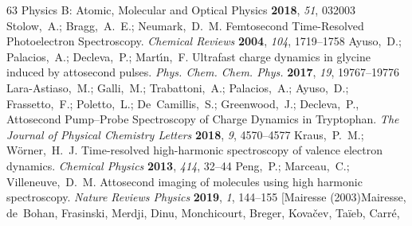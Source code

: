 \documentclass[journal=jacsat,manuscript=article]{achemso}
\begin{document}
\begin{mcitethebibliography}{63}
{  Physics B: Atomic, Molecular and Optical Physics} \textbf{2018}, \emph{51},
  032003\relax
\mciteBstWouldAddEndPuncttrue
\mciteSetBstMidEndSepPunct{\mcitedefaultmidpunct}
{\mcitedefaultendpunct}{\mcitedefaultseppunct}\relax
\EndOfBibitem
{}
Stolow,~A.; Bragg,~A.~E.; Neumark,~D.~M. Femtosecond Time-Resolved
  Photoelectron Spectroscopy. \emph{Chemical Reviews} \textbf{2004},
  \emph{104}, 1719--1758\relax
\mciteBstWouldAddEndPuncttrue
\mciteSetBstMidEndSepPunct{\mcitedefaultmidpunct}
{\mcitedefaultendpunct}{\mcitedefaultseppunct}\relax
\EndOfBibitem
{}
Ayuso,~D.; Palacios,~A.; Decleva,~P.; Mart\'{\i}n,~F. Ultrafast charge dynamics
  in glycine induced by attosecond pulses. \emph{Phys. Chem. Chem. Phys.}
  \textbf{2017}, \emph{19}, 19767--19776\relax
\mciteBstWouldAddEndPuncttrue
\mciteSetBstMidEndSepPunct{\mcitedefaultmidpunct}
{\mcitedefaultendpunct}{\mcitedefaultseppunct}\relax
\EndOfBibitem
{}
Lara-Astiaso,~M.; Galli,~M.; Trabattoni,~A.; Palacios,~A.; Ayuso,~D.;
  Frassetto,~F.; Poletto,~L.; De~Camillis,~S.; Greenwood,~J.; Decleva,~P.,
    Attosecond Pump–Probe Spectroscopy of Charge Dynamics in
  Tryptophan. \emph{The Journal of Physical Chemistry Letters} \textbf{2018},
  \emph{9}, 4570--4577\relax
\mciteBstWouldAddEndPuncttrue
\mciteSetBstMidEndSepPunct{\mcitedefaultmidpunct}
{\mcitedefaultendpunct}{\mcitedefaultseppunct}\relax
\EndOfBibitem
{}
Kraus,~P.~M.; Wörner,~H.~J. Time-resolved high-harmonic spectroscopy of
  valence electron dynamics. \emph{Chemical Physics} \textbf{2013}, \emph{414},
  32--44\relax
\mciteBstWouldAddEndPuncttrue
\mciteSetBstMidEndSepPunct{\mcitedefaultmidpunct}
{\mcitedefaultendpunct}{\mcitedefaultseppunct}\relax
\EndOfBibitem
{}
Peng,~P.; Marceau,~C.; Villeneuve,~D.~M. Attosecond imaging of molecules using
  high harmonic spectroscopy. \emph{Nature Reviews Physics} \textbf{2019},
  \emph{1}, 144--155\relax
\mciteBstWouldAddEndPuncttrue
\mciteSetBstMidEndSepPunct{\mcitedefaultmidpunct}
{\mcitedefaultendpunct}{\mcitedefaultseppunct}\relax
\EndOfBibitem
\bibitem[Mairesse (2003)Mairesse, de~Bohan, Frasinski, Merdji,
  Dinu, Monchicourt, Breger, Kovačev, Taïeb, Carré, 

\end{mcitethebibliography}
\end{document}
